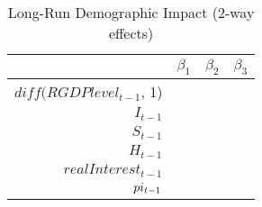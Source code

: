 \begin{table}[ht]
\centering
\begin{tabular}{rrrr}
  \hline
 & $\beta_1$ & $\beta_2$ & $\beta_3$ \\ 
  \hline
$diff(RGDPlevel_{t-1}$, 1) &  &  &  \\ 
  $I_{t-1}$ &  &  &  \\ 
  $S_{t-1}$ &  &  &  \\ 
  $H_{t-1}$ &  &  &  \\ 
  $realInterest_{t-1}$ &  &  &  \\ 
  $\\pi_{t-1}$ &  &  &  \\ 
   \hline
\end{tabular}
\caption{Long-Run Demographic Impact (2-way effects)} 
\end{table}
